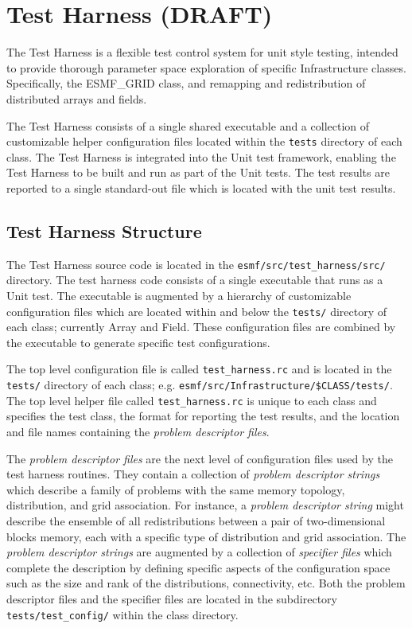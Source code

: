 \section{Test Harness (DRAFT)}
\label{sec:harness}


The Test Harness is a flexible test control system for unit style testing, 
intended to provide thorough parameter space exploration of specific Infrastructure classes. Specifically, the ESMF\_GRID class, and remapping and redistribution of distributed arrays and fields.

The Test Harness consists of a single shared executable and a collection of customizable helper configuration files located within the \texttt{tests} directory of each class. The Test Harness is integrated into the Unit test framework, enabling the Test Harness to be built and run as part of the Unit tests. The test results are reported to a single standard-out file which is located with the unit test results.

\subsection{Test Harness Structure}
The Test Harness source code is  located in the \texttt{esmf/src/test\_harness/src/} directory. The test harness code consists of a single executable that runs as a Unit test. The executable is augmented by a hierarchy  of customizable configuration files which are located within and below the \texttt{tests/} directory of each class; currently Array and Field. These configuration files are combined by the executable to generate specific test configurations. 

The top level configuration file is called \texttt{test\_harness.rc} and is located in the \texttt{tests/} directory of each class; e.g. 
\texttt{esmf/src/Infrastructure/\$CLASS/tests/}. The top level helper file called \texttt{test\_harness.rc} is unique to each class and specifies the test class, the format for reporting the test results, and the location and file names containing the \textit{problem descriptor files}. 

The \textit{problem descriptor files} are the next level of configuration files used by the test harness routines. They contain a collection of 
\textit{problem descriptor strings} which describe a family of problems with the same memory topology, distribution, and grid association. For instance, a \textit{problem descriptor string} might describe the ensemble of all redistributions between a pair of two-dimensional blocks memory, each with a specific type of distribution and grid association. The \textit{problem descriptor strings} are augmented by a collection of \textit{specifier files} which complete the  description by defining specific aspects of the configuration space such as the size and rank of the distributions, connectivity, etc. Both the problem descriptor files and the specifier files are located in the subdirectory \texttt{tests/test\_config/} within the class directory.

